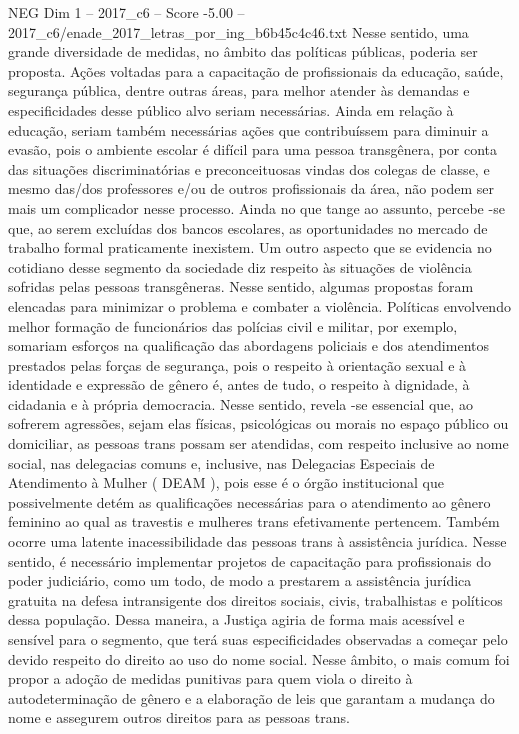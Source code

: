 \begin{textsample}{NEG Dim 1 – 2017\_c6 – Score -5.00 – 2017\_c6/enade\_2017\_letras\_por\_ing\_b6b45c4c46.txt}
Nesse sentido, uma grande diversidade de medidas, no âmbito das políticas públicas, poderia ser proposta.
Ações voltadas para a capacitação de profissionais da educação, saúde, segurança pública, dentre outras áreas, para melhor atender às demandas e especificidades desse público alvo seriam necessárias.
Ainda em relação à educação, seriam também necessárias ações que contribuíssem para diminuir a evasão, pois o ambiente escolar é difícil para uma pessoa transgênera, por conta das situações discriminatórias e preconceituosas vindas dos colegas de classe, e mesmo das/dos professores e/ou de outros profissionais da área, não podem ser mais um complicador nesse processo.
Ainda no que tange ao assunto, percebe -se que, ao serem excluídas dos bancos escolares, as oportunidades no mercado de trabalho formal praticamente inexistem.
Um outro aspecto que se evidencia no cotidiano desse segmento da sociedade diz respeito às situações de violência sofridas pelas pessoas transgêneras.
Nesse sentido, algumas propostas foram elencadas para minimizar o problema e combater a violência.
Políticas envolvendo melhor formação de funcionários das polícias civil e militar, por exemplo, somariam esforços na qualificação das abordagens policiais e dos atendimentos prestados pelas forças de segurança, pois o respeito à orientação sexual e à identidade e expressão de gênero é, antes de tudo, o respeito à dignidade, à cidadania e à própria democracia.
Nesse sentido, revela -se essencial que, ao sofrerem agressões, sejam elas físicas, psicológicas ou morais no espaço público ou domiciliar, as pessoas trans possam ser atendidas, com respeito inclusive ao nome social, nas delegacias comuns e, inclusive, nas Delegacias Especiais de Atendimento à Mulher ( DEAM ), pois esse é o órgão institucional que possivelmente detém as qualificações necessárias para o atendimento ao gênero feminino ao qual as travestis e mulheres trans efetivamente pertencem.
Também ocorre uma latente inacessibilidade das pessoas trans à assistência jurídica.
Nesse sentido, é necessário implementar projetos de capacitação para profissionais do poder judiciário, como um todo, de modo a prestarem a assistência jurídica gratuita na defesa intransigente dos direitos sociais, civis, trabalhistas e políticos dessa população.
Dessa maneira, a Justiça agiria de forma mais acessível e sensível para o segmento, que terá suas especificidades observadas a começar pelo devido respeito do direito ao uso do nome social.
Nesse âmbito, o mais comum foi propor a adoção de medidas punitivas para quem viola o direito à autodeterminação de gênero e a elaboração de leis que garantam a mudança do nome e assegurem outros direitos para as pessoas trans.

\end{textsample}
